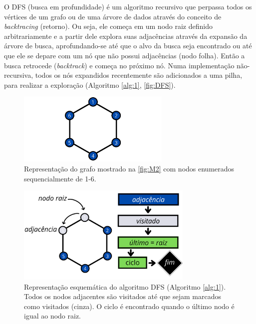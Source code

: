 O DFS\autocite{Knuth1997-jf, Goodrich2001-pd} (busca em profundidade) é um algoritmo recursivo que perpassa todos os vértices de um grafo ou de uma árvore de dados através do conceito de \textit{backtracing} (retorno). Ou seja, ele começa em um nodo raiz definido arbitrariamente e a partir dele explora suas adjacências através da expansão da árvore de busca, aprofundando-se até que o alvo da busca seja encontrado ou até que ele se depare com um nó que não possui adjacências (nodo folha). Então a busca retrocede (\textit{backtrack}) e começa no próximo nó. Numa implementação não-recursiva, todos os nós expandidos recentemente são adicionados a uma pilha, para realizar a exploração (Algoritmo \ref{alg:1}, \autoref{fig:DFS}).

\begin{figure}[htb]
\caption{\label{fig:graphEnumerated}Representação do grafo mostrado na \autoref{fig:M2} com nodos enumerados sequencialmente de 1-6.}
	\begin{center}
		\includegraphics[width=0.65\textwidth]{images/graphEnumerated.png}
	\end{center}
\end{figure}

\begin{figure}[htb]
\caption{\label{fig:DFS} Representação esquemática do algoritmo DFS (Algoritmo \ref{alg:1}). Todos os nodos adjacentes são visitados até que sejam marcados como visitados (cinza). O ciclo é encontrado quando o último nodo é igual ao nodo raiz.}
	\begin{center}
		\includegraphics[width=0.75\textwidth]{images/DFS.png}
	\end{center}
\end{figure}

